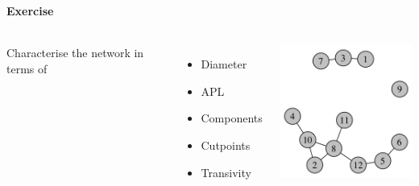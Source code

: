 \documentclass[8pt]{beamer}
\begin{document}
\begin{frame}
\frametitle{\insertsection}
\framesubtitle{Exercise}

\begin{columns}


Characterise the network in terms of
\begin{itemize}
\item Diameter
\item APL
\item Components
\item Cutpoints
\item Transivity
\end{itemize}

\centering
\includegraphics[width=5cm]{exercise.png}

\end{columns}

\end{frame}



\end{document}
